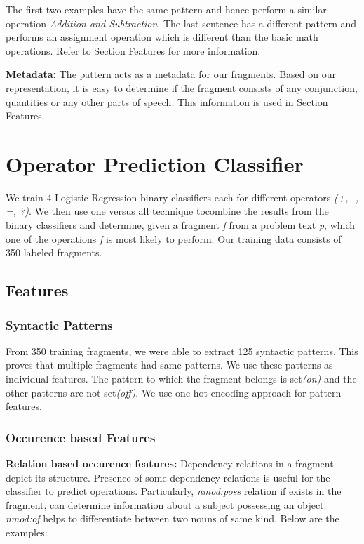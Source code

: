 \documentclass[11pt]{article}
\begin{document}
The first two examples have the same pattern and hence perform a similar operation \textit{Addition and Subtraction}. The last sentence has a different pattern and performs an assignment operation which is different than the basic math operations. Refer to Section Features for more information.

\textbf{Metadata:} The pattern acts as a metadata for our fragments. Based on our representation, it is easy to determine if the fragment consists of any conjunction, quantities or any other parts of speech. This information is used in Section Features.

\section {Operator Prediction Classifier}
We train 4 Logistic Regression binary classifiers each for different operators \textit{(+, -, =, ?)}. We then use one versus all technique tocombine the results from the binary classifiers and determine, given a fragment \textit{f} from a problem text \textit{p}, which one of the operations \textit{f} is most likely to perform. Our training data consists of 350 labeled fragments. 

\subsection {Features}

\subsubsection{Syntactic Patterns}
From 350 training fragments, we were able to extract 125 syntactic patterns. This proves that multiple fragments had same patterns. We use these patterns as individual features. The pattern to which the fragment belongs is set\textit{(on)} and the other patterns are not set\textit{(off)}. We use one-hot encoding approach for pattern features.

\subsubsection{Occurence based Features}

\textbf{Relation based occurence features:} Dependency relations in a fragment depict its structure. Presence of some dependency relations is useful for the classifier to predict operations. Particularly, \textit{nmod:poss} relation if exists in the fragment, can determine information about a subject possessing an object. \textit{nmod:of} helps to differentiate between two nouns of same kind. Below are the examples:
\end{document}
